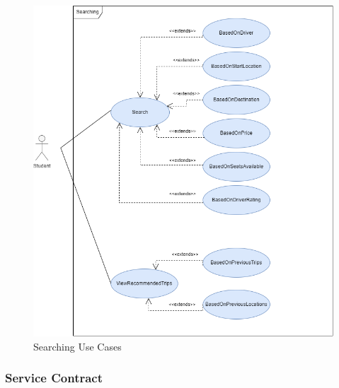 \documentclass[hidelinks, 12pt, a4paper]{article}
\begin{document}
                    \begin{figure}[H]
                    
                        \centering
                        \includegraphics[width = 15cm]{images/SearchingUseCase.drawio.png}
                        \caption{Searching Use Cases}
                        \label{fig:User UseCases}
                        
                    \end{figure}
         \newpage           
                \subsubsection{Service Contract}
            
\end{document}
